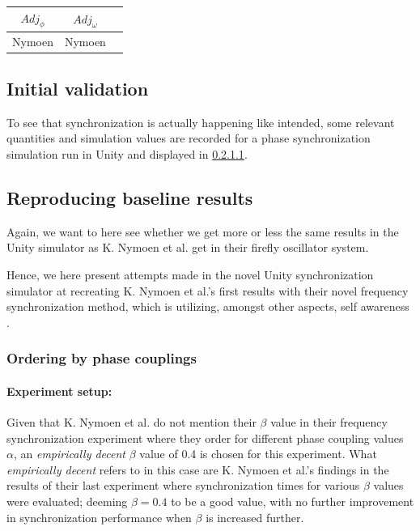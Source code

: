 \begin{center}
\begin{tabular}{ |c|c|c| } 
\hline
$Adj_\phi$ & $Adj_\omega$ \\
\hline
Nymoen & Nymoen  \\
\hline
\end{tabular}
\label{tab:phase_and_freq_sync}
\end{center}



	\subsection{Initial validation}
	
	To see that synchronization is actually happening like intended, some relevant quantities and simulation values are recorded for a phase synchronization simulation run in Unity and displayed in \ref{}.
	
	

	\subsection{Reproducing baseline results}
	Again, we want to here see whether we get more or less the same results in the Unity simulator as K. Nymoen et al. get in their firefly oscillator system.
	
	Hence, we here present attempts made in the novel Unity synchronization simulator at recreating K. Nymoen et al.'s first results with their novel frequency synchronization method, which is utilizing, amongst other aspects, self awareness \cite{nymoen_synch}.
	
		\subsubsection{Ordering by phase couplings}
		\label{exp:phase_and_freq_baseline_reproducing_initial_phase_ordering}
		
			\paragraph{Experiment setup:\nl}
			
			Given that K. Nymoen et al. do not mention their $\beta$ value in their frequency synchronization experiment where they order for different phase coupling values $\alpha$, an \textit{empirically decent} $\beta$ value of 0.4 is chosen for this experiment. What \textit{empirically decent} refers to in this case are K. Nymoen et al.'s findings in the results of their last experiment \cite{nymoen_synch} where synchronization times for various $\beta$ values were evaluated; deeming $\beta=0.4$ to be a good value, with no further improvement in synchronization performance when $\beta$ is increased further.
			
